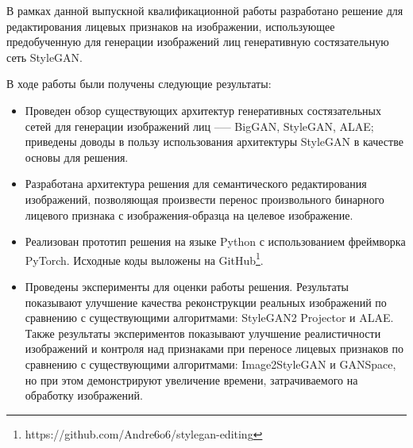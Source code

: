 
В рамках данной выпускной квалификационной работы разработано решение для редактирования лицевых признаков на изображении, использующее предобученную для генерации изображений лиц генеративную состязательную сеть StyleGAN. 

В ходе работы были получены следующие результаты:

\begin{itemize}
\item Проведен обзор существующих архитектур генеративных состязательных сетей для генерации изображений лиц --— BigGAN, StyleGAN, ALAE; приведены доводы в пользу использования архитектуры StyleGAN в качестве основы для решения.
\item Разработана архитектура решения для семантического редактирования изображений, позволяющая произвести перенос произвольного бинарного лицевого признака с изображения-образца на целевое изображение.
\item Реализован прототип решения на языке Python с использованием фреймворка PyTorch. Исходные коды выложены на GitHub\footnote{https://github.com/Andre6o6/stylegan-editing}.

\item Проведены эксперименты для оценки работы решения. 
Результаты показывают улучшение качества реконструкции реальных изображений по сравнению с существующими алгоритмами: \linebreak StyleGAN2 Projector и ALAE. 
Также  результаты экспериментов показывают улучшение реалистичности изображений и контроля над признаками при переносе лицевых признаков по сравнению с существующими алгоритмами: Image2StyleGAN и GANSpace, но при этом демонстрируют увеличение времени, затрачиваемого на обработку изображений.

\end{itemize}